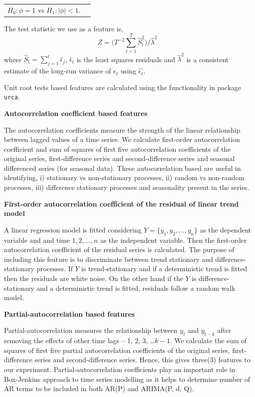 \documentclass[11pt,a4paper,]{article}
\theoremstyle{definition}
\theoremstyle{definition}
\theoremstyle{definition}
\theoremstyle{remark}
\begin{document}
\begin{table}[!h]
\centering
\begin{tabular}{rl}
$H_0: \phi = 1$ vs
$H_1: |\phi| < 1$. 
\end{tabular}
\end{table}

The test statistic we use as a feature is,
\[Z=\big( T^{-2}\sum_{t=1}^{T}\hat{S}_t^2\big)/\hat{\lambda}^2\] where
\(\hat{S}_t=\sum_{j=1}^t\hat{\epsilon}_j\), \(\hat{\epsilon}_t\) is the
least squares residuals and \(\hat{\lambda}^2\) is a consistent estimate
of the long-run variance of \(\epsilon_t\) using \(\hat{\epsilon_t}\).

Unit root tests based features are calculated using the functionality in
package \texttt{urca}\autocite{pfaff2016package}.

\textbf{Autocorrelation coefficient based features}

The autocorrelation coefficients measure the strength of the linear
relationship between lagged values of a time series. We calculate
first-order autocorrelation coefficient and sum of squares of first five
autocorrelation coefficients of the original series, first-difference
series and second-difference series and seasonal differenced series (for
seasonal data). These autocorrelation based are useful in identifying,
i) stationary vs non-stationary processes, ii) random vs non-random
processes, iii) difference stationary processes and seasonality present
in the series.

\textbf{First-order autocorrelation coefficient of the residual of
linear trend model}

A linear regression model is fitted considering
\(Y = \{y_1, y_2, ..., y_n\}\) as the dependent variable and and time
\(1, 2,..., n\) as the independent variable. Then the first-order
autocorrelation coefficient of the residual series is calculated. The
purpose of including this feature is to discriminate between trend
stationary and difference-stationary processes. If \(Y\) is
trend-stationary and if a deterministic trend is fitted then the
residuals are white noise. On the other hand if the \(Y\) is
difference-stationary and a deterministic trend is fitted, residuals
follow a random walk model.

\textbf{Partial-autocorrelation based features}

Partial-autocorrelation measures the relationship between \(y_t\) and
\(y_{t-k}\) after removing the effects of other time lags -- 1, 2, 3,
\ldots{}\(k-1\). We calculate the sum of squares of first five partial
autocorrelation coefficients of the original series, first-difference
series and second-difference series. Hence, this gives three(3) features
to our experiment. Partial-autocorrelation coefficients play an
important role in Box-Jenkins\autocite{box2015time} approach to time
series modelling as it helps to determine number of AR terms to be
included in both AR(P) and ARIMA(P, d, Q).

\newpage

\printbibliography[title=References]
\end{document}
